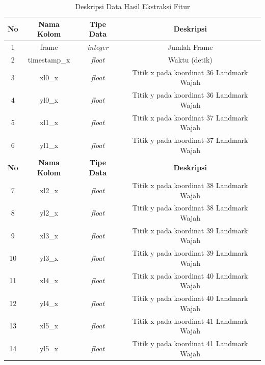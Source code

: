 \begin{longtable}{|c|c|c|c|}
  \caption{Deskripsi Data Hasil Ekstraksi Fitur}
  \label{tb:DeskripsiData}                                                                          \\
  \hline
  \rowcolor[HTML]{C0C0C0}
  \textbf{No} & \textbf{Nama Kolom} & \textbf{Tipe Data} & \textbf{Deskripsi}                       \\
  \hline
  1           & frame               & \textit{integer}   & Jumlah Frame                             \\
  2           & timestamp\_x        & \textit{float}     & Waktu (detik)                            \\
  3           & xl0\_x              & \textit{float}     & Titik x pada koordinat 36 Landmark Wajah \\
  4           & yl0\_x              & \textit{float}     & Titik y pada koordinat 36 Landmark Wajah \\
  5           & xl1\_x              & \textit{float}     & Titik x pada koordinat 37 Landmark Wajah \\
  6           & yl1\_x              & \textit{float}     & Titik y pada koordinat 37 Landmark Wajah \\
  \hline
  \rowcolor[HTML]{C0C0C0}
  \textbf{No} & \textbf{Nama Kolom} & \textbf{Tipe Data} & \textbf{Deskripsi}                       \\
  \hline
  7           & xl2\_x              & \textit{float}     & Titik x pada koordinat 38 Landmark Wajah \\
  8           & yl2\_x              & \textit{float}     & Titik y pada koordinat 38 Landmark Wajah \\
  9           & xl3\_x              & \textit{float}     & Titik x pada koordinat 39 Landmark Wajah \\
  10          & yl3\_x              & \textit{float}     & Titik y pada koordinat 39 Landmark Wajah \\
  11          & xl4\_x              & \textit{float}     & Titik x pada koordinat 40 Landmark Wajah \\
  12          & yl4\_x              & \textit{float}     & Titik y pada koordinat 40 Landmark Wajah \\
  13          & xl5\_x              & \textit{float}     & Titik x pada koordinat 41 Landmark Wajah \\
  14          & yl5\_x              & \textit{float}     & Titik y pada koordinat 41 Landmark Wajah \\

\end{longtable}
